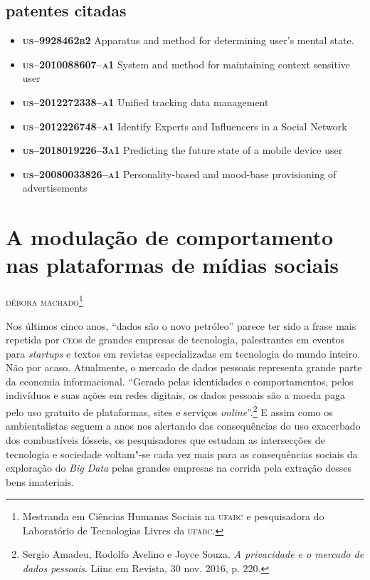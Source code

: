 \section{patentes citadas}

\begin{itemize}
\item[]\textsc{\textbf{us--9928462b2}} Apparatus and method for determining user's mental state.
\item[]\textsc{\textbf{us--2010088607--a1}} System and method for maintaining context sensitive
user
\item[]\textsc{\textbf{us--2012272338--a1}} Unified tracking data management
\item[]\textsc{\textbf{us--2012226748--a1}} Identify Experts and Influencers in a Social Network
\item[]\textsc{\textbf{us--2018019226--3a1}} Predicting the future state of a mobile device user
\item[]\textsc{\textbf{us--20080033826--a1}} Personality-based and mood-base provisioning of
advertisements
\end{itemize}

\chapter{A modulação de comportamento nas plataformas de mídias sociais}

\begin{flushright}
\textsc{débora machado\footnote{Mestranda em Ciências Humanas Sociais na \textsc{ufabc} e pesquisadora do Laboratório de Tecnologias Livres da \textsc{ufabc}.}}
\end{flushright}

\noindent{}Nos últimos cinco anos, ``dados são o novo petróleo'' parece ter sido a
frase mais repetida por \textsc{ceo}s de grandes empresas de tecnologia,
palestrantes em eventos para \emph{startups} e textos em revistas
especializadas em tecnologia do mundo inteiro. Não por acaso.
Atualmente, o mercado de dados pessoais representa grande parte da
economia informacional. ``Gerado pelas identidades e comportamentos,
pelos indivíduos e suas ações em redes digitais, os dados pessoais são a
moeda paga pelo uso gratuito de plataformas, sites e serviços \emph{online}''.\footnote{Sergio Amadeu, Rodolfo Avelino e Joyce Souza. \emph{A privacidade e o
mercado de dados pessoais}. Liinc em Revista, 30 nov. 2016, p. 220.}
E assim como os ambientalistas
seguem a anos nos alertando das consequências do uso exacerbado dos
combustíveis fósseis, os pesquisadores que estudam as intersecções de
tecnologia e sociedade voltam"-se cada vez mais para as consequências
sociais da exploração do \emph{Big Data} pelas grandes empresas na corrida pela
extração desses bens imateriais.

